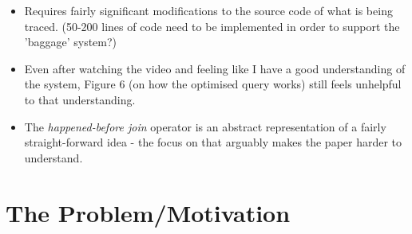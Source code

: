 \documentclass[11pt]{article}
\begin{document}
\begin{itemize}



    \item Requires fairly significant modifications to the source code of what
    is being traced. (50-200 lines of code need to be implemented in order to
    support the 'baggage' system?)










    \item Even after watching the video and feeling like I have a good
    understanding of the system, Figure 6 (on how the optimised query works)
    still feels unhelpful to that understanding.

    \item The \textit{happened-before join} operator is an abstract
    representation of a fairly straight-forward idea - the focus on that
    arguably makes the paper harder to understand.

\end{itemize}

\section*{The Problem/Motivation}
\end{document}
